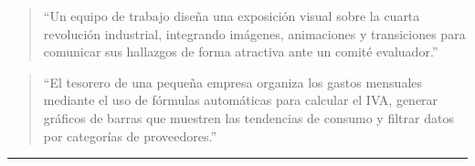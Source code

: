\documentclass[letterpaper,10pt,spanish]{sphinxmanual}
\begin{document}
\begin{enumerate}
\begin{quote}
\sphinxAtStartPar
“Un equipo de trabajo diseña una exposición visual sobre la cuarta revolución industrial, integrando imágenes, animaciones y transiciones para comunicar sus hallazgos de forma atractiva ante un comité evaluador.”
\end{quote}
\begin{quote}

\sphinxAtStartPar
“El tesorero de una pequeña empresa organiza los gastos mensuales mediante el uso de fórmulas automáticas para calcular el IVA, generar gráficos de barras que muestren las tendencias de consumo y filtrar datos por categorías de proveedores.”
\end{quote}

\end{enumerate}


\bigskip\hrule\bigskip
\end{document}
